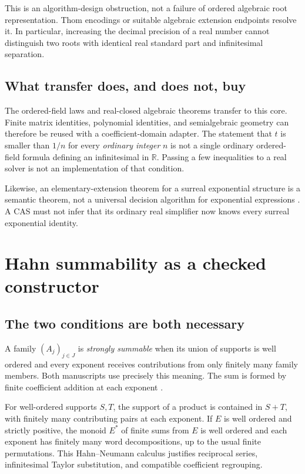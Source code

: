 \documentclass[11pt,letterpaper]{article}
\theoremstyle{definition}
\newcommand{\R}{\mathbb R}
\numberwithin{equation}{section}
\begin{document}
This is an algorithm-design obstruction, not a failure of ordered algebraic root representation. Thom encodings or suitable algebraic extension endpoints resolve it. In particular, increasing the decimal precision of a real number cannot distinguish two roots with identical real standard part and infinitesimal separation.

\subsection{What transfer does, and does not, buy}
The ordered-field laws and real-closed algebraic theorems transfer to this core. Finite matrix identities, polynomial identities, and semialgebraic geometry can therefore be reused with a coefficient-domain adapter. The statement that $t$ is smaller than $1/n$ for every \emph{ordinary integer} $n$ is not a single ordinary ordered-field formula defining an infinitesimal in $\R$. Passing a few inequalities to a real solver is not an implementation of that condition.

Likewise, an elementary-extension theorem for a surreal exponential structure is a semantic theorem, not a universal decision algorithm for exponential expressions \cite{vdDE}. A CAS must not infer that its ordinary real simplifier now knows every surreal exponential identity.

\section{Hahn summability as a checked constructor}\label{sec:support}
\subsection{The two conditions are both necessary}
A family $(A_j)_{j\in J}$ is \emph{strongly summable} when its union of supports is well ordered and every exponent receives contributions from only finitely many family members. Both manuscripts use precisely this meaning. The sum is formed by finite coefficient addition at each exponent \cite{SourceAnalysis,SourceTrig}.

For well-ordered supports $S,T$, the support of a product is contained in $S+T$, with finitely many contributing pairs at each exponent. If $E$ is well ordered and strictly positive, the monoid $E^*$ of finite sums from $E$ is well ordered and each exponent has finitely many word decompositions, up to the usual finite permutations. This Hahn--Neumann calculus justifies reciprocal series, infinitesimal Taylor substitution, and compatible coefficient regrouping.
\end{document}
